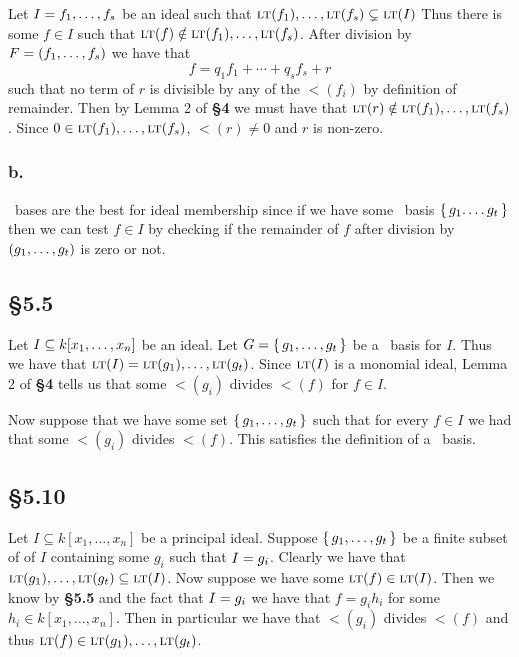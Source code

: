 \documentclass[letterpaper]{article}
\begin{document}
Let $I = \gen{f_{1}, \ldots, f_{s}}$ be an ideal such that $\gen{\lt(f_{1}), \ldots, \lt(f_{s})} \subsetneq \gen{\lt(I)}$ Thus there is some $f \in I$ such that $\lt(f) \notin \gen{\lt(f_{1}), \ldots, \lt(f_{s})}$. After division by $F = \pqty{f_{1}, \ldots, f_{s}}$ we have that
\[
  f = q_{1}f_{1} + \cdots + q_{s}f_{s} + r
\]
such that no term of $r$ is divisible by any of the $\lt(f_{i})$ by definition of remainder. Then by Lemma 2 of \textbf{\S 4} we must have that $\lt(r) \notin \gen{\lt(f_{1}), \ldots, \lt(f_{s})}$. Since $0 \in \gen{\lt(f_{1}), \ldots, \lt(f_{s})}$, $\lt(r) \neq 0$ and $r$ is non-zero. 

\subsubsection*{b.}

\Grobner\ bases are the best for ideal membership since if we have some \Grobner\ basis $\set{g_{1}. \ldots g_{t}}$ then we can test $f \in I$ by checking if the remainder of $f$ after division by $\pqty{g_{1}, \ldots, g_{t}}$ is zero or not.

\clearpage

\subsection*{\S 5.5}

Let $I \subseteq k\bqty{x_{1}, \ldots, x_{n}}$ be an ideal. Let $G = \set{g_{1}, \ldots, g_{t}}$ be a \Grobner\ basis for $I$. Thus we have that $\gen{\lt(I)} = \gen{\lt(g_{1}), \ldots, \lt(g_{t})}$. Since $\gen{\lt(I)}$ is a monomial ideal, Lemma 2 of \textbf{\S 4} tells us that some $\lt(g_{i})$ divides $\lt(f)$ for $f \in I$.

Now suppose that we have some set $\set{g_{1}, \ldots, g_{t}}$ such that for every $f \in I$ we had that some $\lt(g_{i})$ divides $\lt(f)$. This satisfies the definition of a \Grobner\ basis.

\subsection*{\S 5.10}

Let $I \subseteq k[x_{1}, \ldots, x_{n}]$ be a principal ideal. Suppose $\set{g_{1}, \ldots, g_{t}}$ be a finite subset of of $I$ containing some $g_{i}$ such that $I = \gen{g_{i}}$. Clearly we have that $\gen{\lt(g_{1}), \ldots, \lt(g_{t})} \subseteq \gen{\lt(I)}$. Now suppose we have some $\lt(f) \in \gen{\lt(I)}$. Then we know by \textbf{\S 5.5} and the fact that $I = \gen{g_{i}}$ we have that $f = g_{i} h_{i}$ for some $h_{i} \in k[x_{1}, \ldots, x_{n}]$. Then in particular we have that $\lt(g_{i})$ divides $\lt(f)$ and thus $\lt(f) \in \gen{\lt(g_{1}), \ldots, \lt(g_{t})}$.
\end{document}
